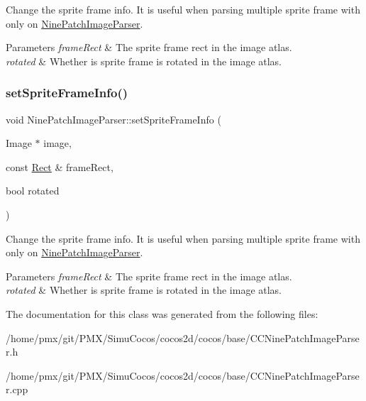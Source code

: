 Change the sprite frame info. It is useful when parsing multiple sprite frame with only on \hyperlink{classNinePatchImageParser}{Nine\+Patch\+Image\+Parser}.


\begin{DoxyParams}{Parameters}
{\em frame\+Rect} & The sprite frame rect in the image atlas. \\
\hline
{\em rotated} & Whether is sprite frame is rotated in the image atlas. \\
\hline
\end{DoxyParams}
\mbox{\label{classNinePatchImageParser_a304418601a8d21cc6cd894158b605ea3}} 
\subsubsection{\texorpdfstring{set\+Sprite\+Frame\+Info()}{setSpriteFrameInfo()}\hspace{0.1cm}{\footnotesize\ttfamily [2/2]}}
{\footnotesize\ttfamily void Nine\+Patch\+Image\+Parser\+::set\+Sprite\+Frame\+Info (\begin{DoxyParamCaption}\item[{Image $\ast$}]{image,  }\item[{const \hyperlink{classRect}{Rect} \&}]{frame\+Rect,  }\item[{bool}]{rotated }\end{DoxyParamCaption})}

Change the sprite frame info. It is useful when parsing multiple sprite frame with only on \hyperlink{classNinePatchImageParser}{Nine\+Patch\+Image\+Parser}.


\begin{DoxyParams}{Parameters}
{\em frame\+Rect} & The sprite frame rect in the image atlas. \\
\hline
{\em rotated} & Whether is sprite frame is rotated in the image atlas. \\
\hline
\end{DoxyParams}


The documentation for this class was generated from the following files\+:\begin{DoxyCompactItemize}
\item 
/home/pmx/git/\+P\+M\+X/\+Simu\+Cocos/cocos2d/cocos/base/C\+C\+Nine\+Patch\+Image\+Parser.\+h\item 
/home/pmx/git/\+P\+M\+X/\+Simu\+Cocos/cocos2d/cocos/base/C\+C\+Nine\+Patch\+Image\+Parser.\+cpp\end{DoxyCompactItemize}
